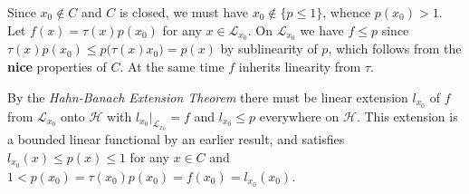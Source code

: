 \documentclass[a4paper]{article}
\newcommand{\Hcal}{\mathcal{H}}
\newcommand{\Lcal}{\mathcal{L}}
\begin{document}
Since $x_0 \notin C$ and $C$ is closed, we must have $x_0\notin \{p\leq 1\}$, whence
$p(x_0) > 1$. Let $f(x) = \tau(x) p(x_0)$ for any $x \in \Lcal_{x_0}$. On $\Lcal_{x_0}$
we have $f\leq p$ since $\tau(x) p(x_0) \leq p\bigl(\tau(x) x_0\bigr) = p(x)$ by
sublinearity of $p$, which follows from the {\bf nice} properties of $C$. At the same
time $f$ inherits linearity from $\tau$.

By the {\it Hahn-Banach Extension Theorem} there must be linear extension $l_{x_0}$
of $f$ from $\Lcal_{x_0}$ onto $\Hcal$ with $l_{x_0}\big\vert_{\Lcal_{x_0}} = f$ and
$l_{x_0} \leq p$ everywhere on $\Hcal$. This extension is a bounded linear functional
by an earlier result, and satisfies $l_{x_0}(x) \leq p(x) \leq 1$ for any $x\in C$
and $1 < p(x_0) = \tau(x_0) p(x_0) = f(x_0) = l_{x_0}(x_0)$.

\end{document}
